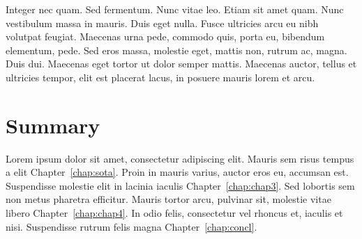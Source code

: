 Integer nec quam. Sed fermentum. Nunc vitae leo. Etiam sit amet
quam. Nunc vestibulum massa in mauris. Duis eget nulla. Fusce
ultricies arcu eu nibh volutpat feugiat. Maecenas urna pede, commodo
quis, porta eu, bibendum elementum, pede. Sed eros massa, molestie
eget, mattis non, rutrum ac, magna. Duis dui. Maecenas eget tortor ut
dolor semper mattis. Maecenas auctor, tellus et ultricies tempor, elit
est placerat lacus, in posuere mauris lorem et arcu. 

\section{Summary} \label{sec:struct}

Lorem ipsum dolor sit amet, consectetur adipiscing elit.
Mauris sem risus tempus a elit Chapter~\ref{chap:sota}.
Proin in mauris varius, auctor eros eu, accumsan est.
Suspendisse molestie elit in lacinia iaculis Chapter~\ref{chap:chap3}.
Sed lobortis sem non metus pharetra efficitur. Mauris tortor arcu,
pulvinar sit, molestie vitae libero Chapter~\ref{chap:chap4}.
In odio felis, consectetur vel rhoncus et, iaculis et nisi.
Suspendisse rutrum felis magna Chapter~\ref{chap:concl}.
